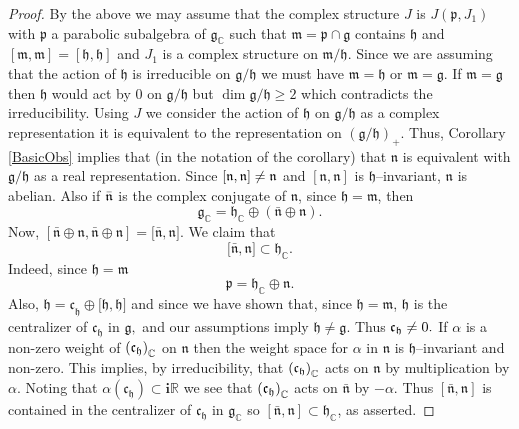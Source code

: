 \documentclass{amse-new}
\numberwithin{equation}{section} %
\begin{document}
\begin{proof}
By the above we may assume that the  complex structure $J$ is $J(%
\mathfrak{\mathfrak{p}},J_{1})$ with $\mathfrak{p}$ a parabolic subalgebra
of $\mathfrak{g}_{\mathbb{C}}$ such that $\mathfrak{m}=\mathfrak{p\cap
\mathfrak{g}}$ contains $\mathfrak{h}$ and $[\mathfrak{m},\mathfrak{m}]=[\mathfrak{h},\mathfrak{h}]$
and $J_{1}$ is a complex structure on $\mathfrak{m}/\mathfrak{h}$.
 Since we are assuming that the action of $\mathfrak{h}$ is irreducible on $\mathfrak{g}/\mathfrak{h}$  we must have $\mathfrak{m}=\mathfrak{h}$ or $\mathfrak{m}=\mathfrak{g}.$
If $\mathfrak{m}=\mathfrak{g}$ then $\mathfrak{h}$ would act by $0$ on
$\mathfrak{g}/\mathfrak{h}$ but $\dim \mathfrak{g}/\mathfrak{h}\geq 2$ which
contradicts the irreducibility. Using $J$ we  consider the action of $%
\mathfrak{h}$ on $\mathfrak{g}/\mathfrak{h}$ as a complex representation it
is equivalent to the representation on $\left( \mathfrak{g}/\mathfrak{h}%
\right) _{+}$.  Thus, Corollary \ref{BasicObs}  implies that (in the notation of the
corollary) that $\mathfrak{\mathfrak{n}}$ is equivalent with $\mathfrak{g}/%
\mathfrak{h}$ as a real representation. Since $\left[ \mathfrak{n},\mathfrak{%
n}\right] \neq \mathfrak{n}$ and $\left[ \mathfrak{n},\mathfrak{n}\right] $
is $\mathfrak{h}$--invariant, $\mathfrak{n}$ is abelian. Also if $\mathfrak{%
\bar{n}}$ is the complex conjugate of $\mathfrak{n}$, since $\mathfrak{h}=\mathfrak{m}$, then
\[
\mathfrak{g}_{\mathbb{C}}=\mathfrak{h}_{\mathbb{C}}\oplus \left(\bar{\mathfrak{n}}%
\oplus \mathfrak{n}\right).
\]%
Now, $[\mathfrak{\bar{n}\oplus
\mathfrak{n}},\mathfrak{\bar{n}\oplus \mathfrak{n}}]=[\mathfrak{\bar{n},%
\mathfrak{n].}}$ We claim that
\begin{equation}\label{eq:helpsym}
\lbrack \mathfrak{\bar{n},\mathfrak{n}}]\subset \mathfrak{h}_{\mathbb{C}}%
\mathfrak{.}
\end{equation}
Indeed, since $\mathfrak{h}=\mathfrak{m}$
\[
\mathfrak{p=\mathfrak{h}}_{\mathbb{C}}\oplus \mathfrak{n.}
\]%
Also, $\mathfrak{h=\mathfrak{c}}_{\mathfrak{h}}\oplus \lbrack \mathfrak{h},%
\mathfrak{h]}$ and since we have shown that, since $\mathfrak{h}=\mathfrak{m}$,  $\mathfrak{h}$ is the centralizer
of $\mathfrak{c}_{\mathfrak{h}}$ in $\mathfrak{g,}$ and our assumptions
imply $\mathfrak{h\neq \mathfrak{g.}}$ Thus $\mathfrak{\mathfrak{c}}_{%
\mathfrak{h}}\neq 0.$ If $\alpha $ is a non-zero weight of $\left( \mathfrak{%
c}_{\mathfrak{h}}\right) _{\mathbb{C}}$ on $\mathfrak{n}$ then the weight
space for $\alpha $ in $\mathfrak{n}$ is $\mathfrak{h}$--invariant and
non-zero. This implies, by irreducibility, that $\left( \mathfrak{c}_{%
\mathfrak{h}}\right) _{\mathbb{C}}$ acts on $\mathfrak{n}$ by multiplication
by $\alpha $. Noting that $\alpha (\mathfrak{c}_{\mathfrak{h}})\subset \mathbf{i}%
\mathbb{R}$ we see that $\left( \mathfrak{c}_{\mathfrak{h}}\right) _{\mathbb{%
C}}$ acts on $\mathfrak{\bar{n}}$ by $-\alpha.$ Thus $[\mathfrak{\bar{n},%
\mathfrak{n}}]$ is contained in the centralizer of $\mathfrak{c}_{\mathfrak{h%
}}$ in $\mathfrak{g}_{\mathbb{C}}$ so $[\mathfrak{\bar{n},\mathfrak{n}}%
]\subset \mathfrak{h}_{\mathbb{C}}$, as asserted.


\end{proof}
\end{document}
